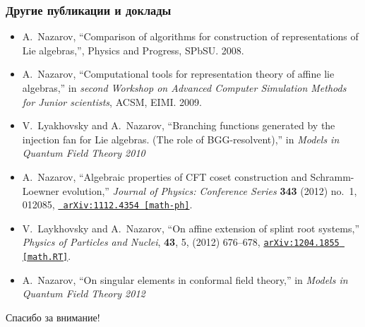 \documentclass[pdftex]{beamer}
\theoremstyle{definition} \newtheorem{Def}{Определение}
\begin{document}
\begin{frame}
  \frametitle{Другие публикации и доклады}
  \begin{itemize}
  \item
    A.~Nazarov, ``Comparison of algorithms for construction of representations of
    Lie algebras,'', Physics and Progress, SPbSU.
     2008.

  \item
    A.~Nazarov, ``Computational tools for representation theory of affine lie
    algebras,'' in {\em second Workshop on Advanced Computer Simulation Methods
      for Junior scientists}, ACSM, EIMI.
     2009.

  \item
    V.~{Lyakhovsky} and A.~{Nazarov}, ``{Branching functions generated by the
      injection fan for Lie algebras. (The role of BGG-resolvent)},'' in 
    {\em Models in Quantum Field Theory 2010} 

  \item
    A.~{Nazarov}, ``{Algebraic properties of CFT coset construction and
      Schramm-Loewner evolution},'' {\em Journal of Physics: Conference Series}
    {\bf 343} (2012) no.~1, 012085, \href{http://arxiv.org/abs/1112.4354}{{\tt
        arXiv:1112.4354 [math-ph]}}.

  \item
    V.~{Laykhovsky} and A.~{Nazarov}, ``{On affine extension of splint root
      systems},'' {\em Physics of Particles and Nuclei}, {\bf 43}, 5, (2012) 676--678,
    \href{http://arxiv.org/abs/1204.1855}{{\tt arXiv:1204.1855 [math.RT]}}.


  \item 
    A.~{Nazarov}, ``{On singular elements in conformal field theory},'' in 
    {\em Models in Quantum Field Theory 2012} 

  \end{itemize}
\end{frame}

\begin{frame}[c,plain]
  \begin{center}
  \Large{Спасибо за внимание!}    
  \end{center}

\end{frame}
\end{document}

